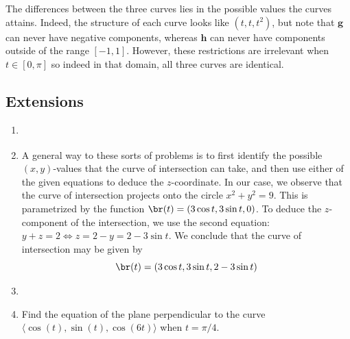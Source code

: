 \begin{enumerate}[resume]
{    }
    {The differences between the three curves lies in the possible values the curves attains. Indeed, the structure of each curve looks like $(t,t,t^2)$, but note that $\mathbf{g}$ can never have negative components, whereas $\mathbf{h}$ can never have components outside of the range $[-1,1]$. However, these restrictions are irrelevant when $t\in [0,\pi]$ so indeed in that domain, all three curves are identical. 
    } 
    
\end{enumerate}
\subsection*{Extensions}
\begin{enumerate}[resume]
	 \item {}
    {%

    }
    {%
    } 
	\item {}
    {%

    }
    {A general way to these sorts of problems is to first identify the possible $(x,y)$-values that the curve of intersection can take, and then use either of the given equations to deduce the $z$-coordinate. In our case, we observe that the curve of intersection projects onto the circle $x^2+y^2=9$. This is parametrized by the function $\br(t) = (3\cos t, 3\sin t, 0)$. To deduce the $z$-component of the intersection, we use the second equation: $y+z = 2 \iff z = 2-y = 2-3\sin t$. We conclude that the curve of intersection may be given by
\begin{equation*}
    \br(t) = (3\cos t, 3\sin t, 2-3\sin t)
\end{equation*}
    } 
	
	\item {} 
    {%

    }
    {%
    }
	
	\item Find the equation of the plane perpendicular to the curve $\langle \cos(t),\sin(t),\cos(6t)\rangle$ when $t=\pi/4$.
\end{enumerate}
{}


